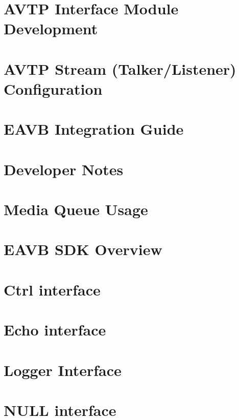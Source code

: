 \documentclass[twoside]{book}
\newcommand{\+}{\discretionary{\mbox{\scriptsize$\hookleftarrow$}}{}{}}
\begin{document}
\chapter{A\+V\+TP Interface Module Development}
\label{sdk_avtp_interface_module_dev}
\hypertarget{sdk_avtp_interface_module_dev}{}

\chapter{A\+V\+TP Stream (Talker/\+Listener) Configuration}
\label{sdk_avtp_stream_cfg}
\hypertarget{sdk_avtp_stream_cfg}{}

\chapter{E\+A\+VB Integration Guide}
\label{sdk_integration}
\hypertarget{sdk_integration}{}

\chapter{Developer Notes}
\label{sdk_notes}
\hypertarget{sdk_notes}{}

\chapter{Media Queue Usage}
\label{sdk_notes_media_queue_usage}
\hypertarget{sdk_notes_media_queue_usage}{}

\chapter{E\+A\+VB S\+DK Overview}
\label{sdk_overview}
\hypertarget{sdk_overview}{}

\chapter{Ctrl interface}
\label{ctrl_intf}
\hypertarget{ctrl_intf}{}

\chapter{Echo interface}
\label{echo_host_intf}
\hypertarget{echo_host_intf}{}

\chapter{Logger Interface}
\label{logger_intf}
\hypertarget{logger_intf}{}

\chapter{N\+U\+LL interface}
\label{null_host_intf}
\hypertarget{null_host_intf}{}

\end{document}
